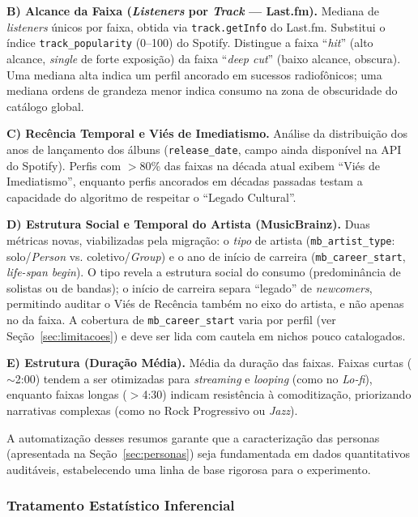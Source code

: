 \documentclass[12pt, %
openright,
oneside, %
a4paper,    %
english,   %
brazil]{facom-ufu-abntex2}
\begin{document}
\textbf{B) Alcance da Faixa (\emph{Listeners} por \emph{Track} --- Last.fm).}
Mediana de \emph{listeners} únicos por faixa, obtida via \texttt{track.getInfo}
do Last.fm. Substitui o índice \texttt{track\_popularity} (0--100) do Spotify.
Distingue a faixa ``\emph{hit}'' (alto alcance, \emph{single} de forte
exposição) da faixa ``\emph{deep cut}'' (baixo alcance, obscura). Uma mediana
alta indica um perfil ancorado em sucessos radiofônicos; uma mediana ordens de
grandeza menor indica consumo na zona de obscuridade do catálogo global.

\textbf{C) Recência Temporal e Viés de Imediatismo.} Análise da distribuição dos
anos de lançamento dos álbuns (\texttt{release\_date}, campo ainda disponível na
API do Spotify). Perfis com $>$80\% das
faixas na década atual exibem ``Viés de Imediatismo'', enquanto perfis ancorados
em décadas passadas testam a capacidade do algoritmo de respeitar o ``Legado
Cultural''.

\textbf{D) Estrutura Social e Temporal do Artista (MusicBrainz).} Duas métricas
novas, viabilizadas pela migração: o \emph{tipo} de artista
(\texttt{mb\_artist\_type}: solo/\emph{Person} vs. coletivo/\emph{Group}) e o ano
de início de carreira (\texttt{mb\_career\_start}, \emph{life-span begin}). O
tipo revela a estrutura social do consumo (predominância de solistas ou de
bandas); o início de carreira separa ``legado'' de \emph{newcomers}, permitindo
auditar o Viés de Recência também no eixo do artista, e não apenas no da faixa. A
cobertura de \texttt{mb\_career\_start} varia por perfil (ver Seção~\ref{sec:limitacoes})
e deve ser lida com cautela em nichos pouco catalogados.

\textbf{E) Estrutura (Duração Média).} Média da duração das faixas. Faixas curtas
($\sim$2:00) tendem a ser otimizadas para \emph{streaming} e \emph{looping} (como
no \emph{Lo-fi}), enquanto faixas longas ($>$4:30) indicam resistência à
comoditização, priorizando narrativas complexas (como no Rock Progressivo ou
\emph{Jazz}).

A automatização desses resumos garante que a caracterização das personas
(apresentada na Seção~\ref{sec:personas}) seja fundamentada em dados
quantitativos auditáveis, estabelecendo uma linha de base rigorosa para o
experimento.

\subsubsection{Tratamento Estatístico Inferencial}
\label{sec:inferencial}
\end{document}
